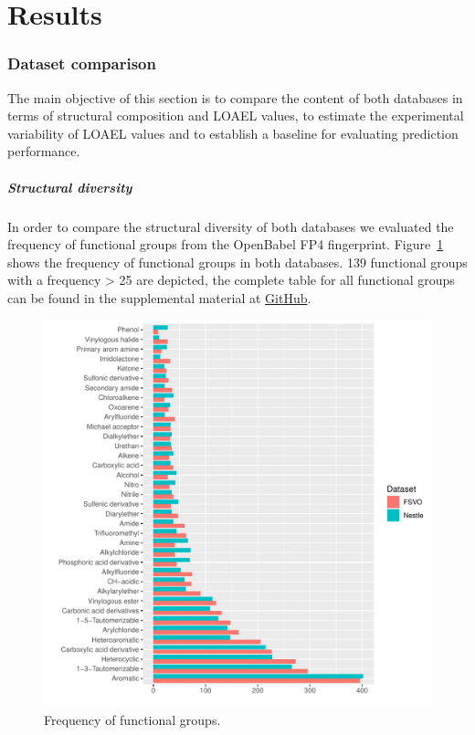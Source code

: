 \documentclass[]{achemso}
\let\oldsubparagraph\subparagraph
\renewcommand{\subparagraph}[1]{\oldsubparagraph{#1}\mbox{}}
\begin{document}
\section{Results}\label{results}

\subsubsection{Dataset comparison}\label{dataset-comparison}

The main objective of this section is to compare the content of both
databases in terms of structural composition and LOAEL values, to
estimate the experimental variability of LOAEL values and to establish a
baseline for evaluating prediction performance.

\subparagraph{Structural diversity}\label{structural-diversity}

In order to compare the structural diversity of both databases we
evaluated the frequency of functional groups from the OpenBabel FP4
fingerprint. Figure~\ref{fig:fg} shows the frequency of functional
groups in both databases. 139 functional groups with a frequency
\textgreater{} 25 are depicted, the complete table for all functional
groups can be found in the supplemental material at
\href{https://github.com/opentox/loael-paper/blob/submission/data/functional-groups.csv}{GitHub}.

\begin{figure}
\centering
\includegraphics{figures/functional-groups.pdf}
\caption{Frequency of functional groups.}\label{fig:fg}
\end{figure}
\end{document}
